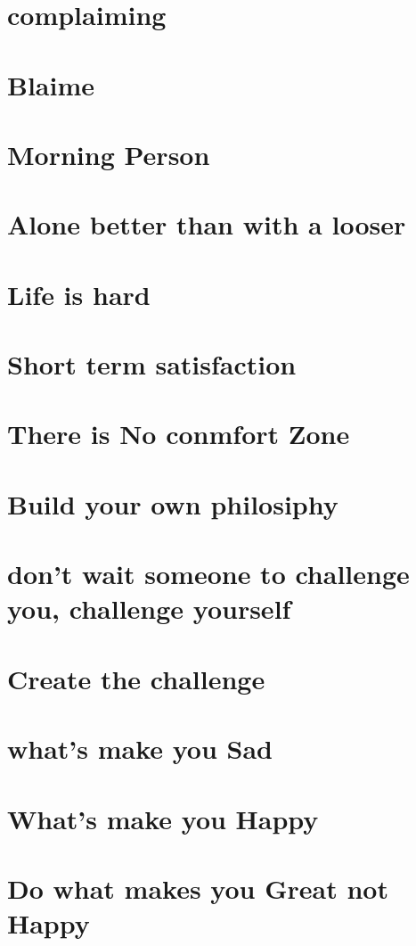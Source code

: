 \documentclass[12pt]{article}
\begin{document}
	\section{complaiming}
	\section{Blaime}
	\section{Morning Person}
	\section{Alone better than with a looser}
	\section{Life is hard}
	\section{Short term satisfaction}
	\section{There is No conmfort Zone}
	\section{Build your own philosiphy}
	\section{don't wait someone to challenge you, challenge yourself}
	\section{Create the challenge}
	\section{what's make you Sad}
	\section{What's make you Happy}
	\section{Do what makes you Great not Happy}
\end{document}
